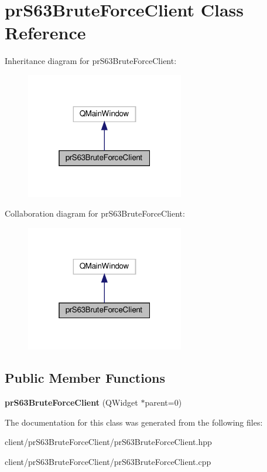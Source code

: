 \hypertarget{classpr_s63_brute_force_client}{}\section{pr\+S63\+Brute\+Force\+Client Class Reference}
\label{classpr_s63_brute_force_client}


Inheritance diagram for pr\+S63\+Brute\+Force\+Client\+:\nopagebreak
\begin{figure}[H]
\begin{center}
\leavevmode
\includegraphics[width=196pt]{classpr_s63_brute_force_client__inherit__graph}
\end{center}
\end{figure}


Collaboration diagram for pr\+S63\+Brute\+Force\+Client\+:\nopagebreak
\begin{figure}[H]
\begin{center}
\leavevmode
\includegraphics[width=196pt]{classpr_s63_brute_force_client__coll__graph}
\end{center}
\end{figure}
\subsection*{Public Member Functions}
\begin{DoxyCompactItemize}
\item 
\mbox{\label{classpr_s63_brute_force_client_afa4597562e1bc7baa938d6fb29989d25}} 
{\bfseries pr\+S63\+Brute\+Force\+Client} (Q\+Widget $\ast$parent=0)
\end{DoxyCompactItemize}


The documentation for this class was generated from the following files\+:\begin{DoxyCompactItemize}
\item 
client/pr\+S63\+Brute\+Force\+Client/pr\+S63\+Brute\+Force\+Client.\+hpp\item 
client/pr\+S63\+Brute\+Force\+Client/pr\+S63\+Brute\+Force\+Client.\+cpp\end{DoxyCompactItemize}
